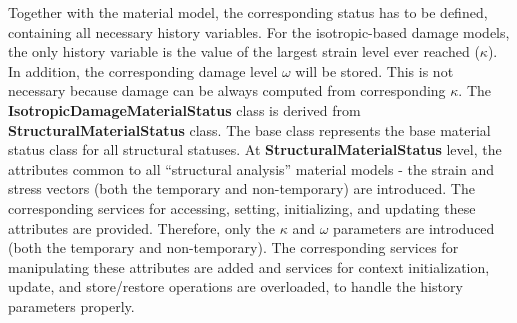 \documentclass[12pt,draft]{article}
\newcommand{\class}[1]{{\bf #1}}
\begin{document}
 Together with the material model, the corresponding status has to be
 defined, containing all necessary history variables.
 For the isotropic-based damage models, the only history variable is 
 the value of the largest strain level ever reached ($\kappa$).
 In addition, the corresponding damage level $\omega$ will be stored.
 This is not necessary because damage can be always computed from
 corresponding $\kappa$.
 The \class{IsotropicDamageMaterialStatus} class is derived from 
 \class{StructuralMaterialStatus} class. The base class represents the
 base material status class for all structural statuses. At
 \class{StructuralMaterialStatus} level, the attributes common to all
 ``structural analysis'' material models - the strain and
 stress vectors (both the temporary and non-temporary) are introduced. The
 corresponding services for accessing, setting, initializing, and
 updating these attributes are provided.
 Therefore, only the $\kappa$ and $\omega$ parameters are introduced
 (both the temporary and non-temporary). The corresponding services for
 manipulating these attributes are added and services for context
 initialization, update, and store/restore operations are overloaded, to
 handle the history parameters properly.
\end{document}
